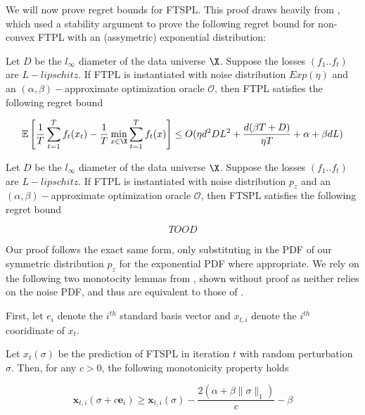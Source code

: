 We will now prove regret bounds for FTSPL. This proof draws heavily from \cite{SN19}, which used a stability argument to prove the following regret bound for non-convex FTPL with an (assymetric) exponential distribution:

\begin{lemma}
    Let $D$ be the $l_\infty$ diameter of the data universe $\X$. Suppose the losses $(f_1..f_t)$ are $L-lipschitz$. If FTPL is instantiated with noise distribution $Exp(\eta)$ and an $(\alpha, \beta)-$approximate optimization oracle $\mathcal{O}$, then FTPL satisfies the following regret bound

    \begin{equation}
        \mathbb{E}\left[ \frac{1}{T}\sum_{t=1}^T f_t(x_t) - \frac{1}{T}\min_{x\in \X}\sum_{t=1}^T f_t(x) \right] \leq O(\eta d^2 D L^2 + \frac{d(\beta T + D)}{\eta T} + \alpha + \beta d L)
    \end{equation}
\end{lemma}


\begin{theorem}\label{thm:ftspl-regret}
    Let $D$ be the $l_\infty$ diameter of the data universe $\X$. Suppose the losses $(f_1..f_t)$ are $L-lipschitz$. If FTPL is instantiated with noise distribution $p_z$ and an $(\alpha, \beta)-$approximate optimization oracle $\mathcal{O}$, then FTSPL satisfies the following regret bound

    \begin{equation}
        TOOD
    \end{equation}
\end{theorem}
Our proof follows the exact same form, only substituting in the PDF of our symmetric distribution $p_z$ for the exponential PDF where appropriate. We rely on the following two monotocity lemmas from , shown without proof as neither relies on the noise PDF, and thus are equivalent to those of \cite{SN19}. 



First, let $e_i$ denote the $i^{th}$ standard basis vector and $x_{t,i}$ denote the $i^{th}$ cooridinate of $x_t$. 

\begin{lemma}
    Let $x_t(\sigma)$ be the prediction of FTSPL in iteration $t$ with random perturbation $\sigma$. Then, for any $c > 0$, the following monotonicity property holds

    \begin{equation}
        \mathbf{x}_{t, i}\left(\sigma+c \mathbf{e}_{i}\right) \geq \mathbf{x}_{t, i}(\sigma)-\frac{2\left(\alpha+\beta\|\sigma\|_{1}\right)}{c}-\beta
    \end{equation}
\end{lemma}

